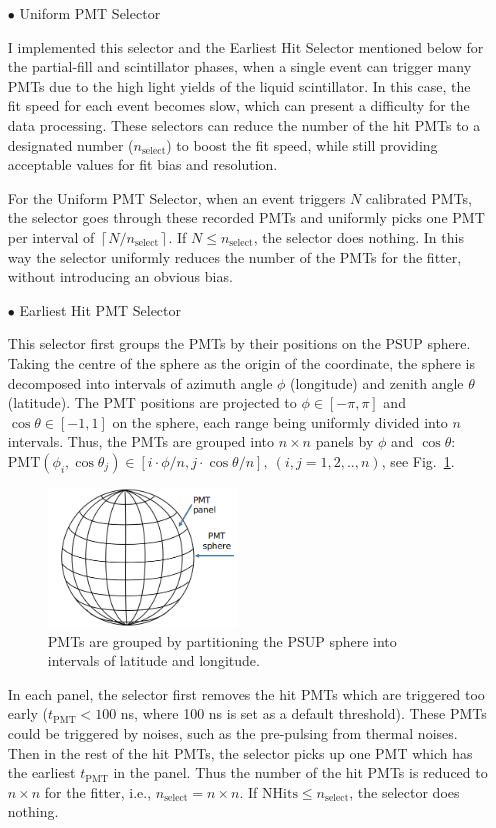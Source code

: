 \begin{itemize}
	\item[$\bullet$] Uniform PMT Selector
	
	I implemented this selector and the Earliest Hit Selector mentioned below for the partial-fill and scintillator phases, when a single event can trigger many PMTs due to the high light yields of the liquid scintillator. In this case, the fit speed for each event becomes slow, which can present a difficulty for the data processing. These selectors can reduce the number of the hit PMTs to a designated number ($n_\mathrm{select}$) to boost the fit speed, while still providing acceptable values for fit bias and resolution. 
	
	For the Uniform PMT Selector, when an event triggers $N$ calibrated PMTs, the selector goes through these recorded PMTs and uniformly picks one PMT per interval of $\left \lceil{N/n_\mathrm{select}}\right \rceil $. If $N\leq n_\mathrm{select}$, the selector does nothing. In this way the selector uniformly reduces the number of the PMTs for the fitter, without introducing an obvious bias.
	
	\item[$\bullet$] Earliest Hit PMT Selector
	
	This selector first groups the PMTs by their positions on the PSUP sphere. Taking the centre of the sphere as the origin of the coordinate, the sphere is decomposed into intervals of azimuth angle $\phi$ (longitude) and zenith angle $\theta$ (latitude). The PMT positions are projected to $\phi\in [-\pi,\pi]$ and $\cos\theta\in [-1, 1]$ on the sphere, each range being uniformly divided into $n$ intervals. Thus, the PMTs are grouped into $n\times n$ panels by $\phi$ and $\cos\theta$: $\mathrm{PMT}(\phi_i,\cos\theta_j) \in [i\cdot\phi/n, j\cdot\cos\theta/n],~(i,j=1,2,..,n)$, see Fig.~\ref{GroupPMTs}. 
	\begin{figure}[!htb]
		\centering
		\includegraphics[width=5cm]{GroupPMTs.png}
		\caption{PMTs are grouped by partitioning the PSUP sphere into intervals of latitude and longitude.}
		\label{GroupPMTs}
	\end{figure}
	
	In each panel, the selector first removes the hit PMTs which are triggered too early ($t_\mathrm{PMT}<100$ ns, where 100 ns is set as a default threshold). These PMTs could be triggered by noises, such as the pre-pulsing from thermal noises. Then in the rest of the hit PMTs, the selector picks up one PMT which has the earliest $t_\mathrm{PMT}$ in the panel. Thus the number of the hit PMTs is reduced to $n\times n$ for the fitter, i.e., $n_\mathrm{select}=n\times n$. If $\mathrm{NHits}\leq n_\mathrm{select}$, the selector does nothing. 
	

\end{itemize}
